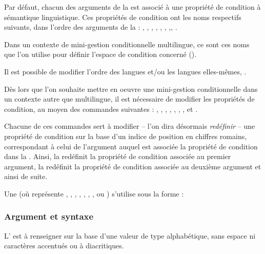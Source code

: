 \documentclass{article}
\begin{document}
Par défaut, chacun des arguments de la  est associé à une propriété de condition à sémantique linguistique. Ces propriétés de condition ont les noms respectifs suivants, dans l'ordre des arguments de la  : , , , , , , ,, .

Dans un contexte de mini-gestion conditionnelle multilingue, ce sont ces noms que l'on utilise pour définir l'espace de condition concerné ().

Il est possible de modifier l'ordre des langues et/ou les langues elles-mêmes, .

Dès lors que l'on souhaite mettre en oeuvre une mini-gestion conditionnelle dans un contexte autre que multilingue, il est nécessaire de modifier les propriétés de condition, au moyen des commandes suivantes : , , , , , , ,  et .

Chacune de ces commandes sert à modifier -- l'on dira désormais \emph{redéfinir} -- une propriété de condition sur la base d'un indice de position en chiffres romains, correspondant à celui de l'argument auquel est associée la propriété de condition dans la . Ainsi, la  redéfinit la propriété de condition associée au premier argument, la  redéfinit la propriété de condition associée au deuxième argument et ainsi de suite.

Une  (où \code{-} représente , , , , , , ,  ou ) s'utilise sous la forme :


\subsubsection{Argument et syntaxe}
L' est à renseigner sur la base d'une valeur de type alphabétique, sans espace ni caractères accentués ou à diacritiques.
\end{document}
